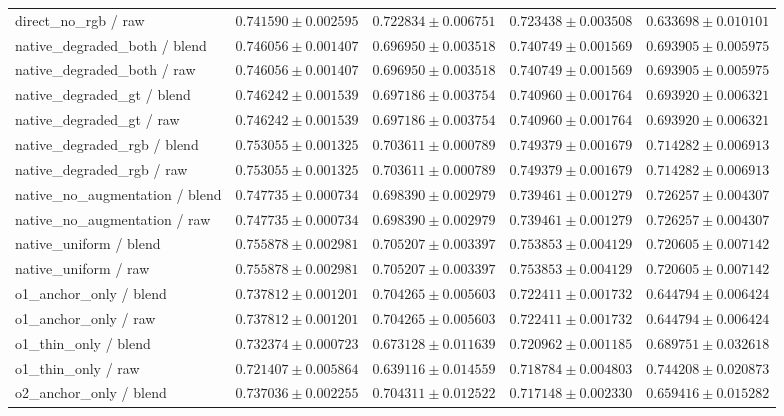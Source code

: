 \documentclass[jimaging,article,submit,pdftex,moreauthors]{Definitions/mdpi}
\begin{document}
\begin{longtable}{@{}>{\raggedright\arraybackslash}p{5.0cm}>{\raggedright\arraybackslash}p{2.5cm}>{\raggedright\arraybackslash}p{2.5cm}>{\raggedright\arraybackslash}p{2.5cm}>{\raggedright\arraybackslash}p{2.5cm}@{}}
direct\_no\_rgb / raw & $0.741590\pm 0.002595$ & $0.722834\pm 0.006751$ & $0.723438\pm 0.003508$ & $0.633698\pm 0.010101$\\
native\_degraded\_both / blend & $0.746056\pm 0.001407$ & $0.696950\pm 0.003518$ & $0.740749\pm 0.001569$ & $0.693905\pm 0.005975$\\
native\_degraded\_both / raw & $0.746056\pm 0.001407$ & $0.696950\pm 0.003518$ & $0.740749\pm 0.001569$ & $0.693905\pm 0.005975$\\
native\_degraded\_gt / blend & $0.746242\pm 0.001539$ & $0.697186\pm 0.003754$ & $0.740960\pm 0.001764$ & $0.693920\pm 0.006321$\\
native\_degraded\_gt / raw & $0.746242\pm 0.001539$ & $0.697186\pm 0.003754$ & $0.740960\pm 0.001764$ & $0.693920\pm 0.006321$\\
native\_degraded\_rgb / blend & $0.753055\pm 0.001325$ & $0.703611\pm 0.000789$ & $0.749379\pm 0.001679$ & $0.714282\pm 0.006913$\\
native\_degraded\_rgb / raw & $0.753055\pm 0.001325$ & $0.703611\pm 0.000789$ & $0.749379\pm 0.001679$ & $0.714282\pm 0.006913$\\
native\_no\_augmentation / blend & $0.747735\pm 0.000734$ & $0.698390\pm 0.002979$ & $0.739461\pm 0.001279$ & $0.726257\pm 0.004307$\\
native\_no\_augmentation / raw & $0.747735\pm 0.000734$ & $0.698390\pm 0.002979$ & $0.739461\pm 0.001279$ & $0.726257\pm 0.004307$\\
native\_uniform / blend & $0.755878\pm 0.002981$ & $0.705207\pm 0.003397$ & $0.753853\pm 0.004129$ & $0.720605\pm 0.007142$\\
native\_uniform / raw & $0.755878\pm 0.002981$ & $0.705207\pm 0.003397$ & $0.753853\pm 0.004129$ & $0.720605\pm 0.007142$\\
o1\_anchor\_only / blend & $0.737812\pm 0.001201$ & $0.704265\pm 0.005603$ & $0.722411\pm 0.001732$ & $0.644794\pm 0.006424$\\
o1\_anchor\_only / raw & $0.737812\pm 0.001201$ & $0.704265\pm 0.005603$ & $0.722411\pm 0.001732$ & $0.644794\pm 0.006424$\\
o1\_thin\_only / blend & $0.732374\pm 0.000723$ & $0.673128\pm 0.011639$ & $0.720962\pm 0.001185$ & $0.689751\pm 0.032618$\\
o1\_thin\_only / raw & $0.721407\pm 0.005864$ & $0.639116\pm 0.014559$ & $0.718784\pm 0.004803$ & $0.744208\pm 0.020873$\\
o2\_anchor\_only / blend & $0.737036\pm 0.002255$ & $0.704311\pm 0.012522$ & $0.717148\pm 0.002330$ & $0.659416\pm 0.015282$\\

\end{longtable}
\end{document}
